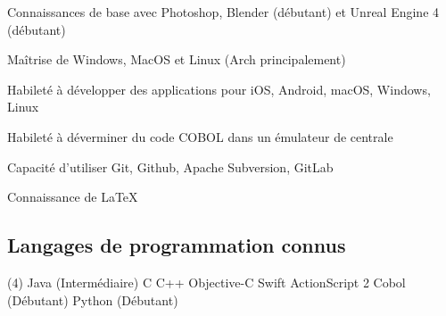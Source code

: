 \begin{cvitems}
\item{Connaissances de base avec Photoshop, Blender (débutant) et Unreal Engine 4 (débutant)}
\item{Maîtrise de Windows, MacOS et Linux (Arch principalement)}
\item{Habileté à développer des applications pour iOS, Android, macOS, Windows, Linux}
\item{Habileté à déverminer du code COBOL dans un émulateur de centrale}
\item{Capacité d'utiliser Git, Github, Apache Subversion, GitLab}
\item{Connaissance de LaTeX}
\end{cvitems}
\subsection*{Langages de programmation connus}
\begin{tasks}(4)
    \task[•] Java (Intermédiaire) \task[•] C
    \task[•] C++ \task[•] Objective-C
    \task[•] Swift \task[•] ActionScript 2
    \task[•] Cobol (Débutant) \task[•] Python (Débutant)
\end{tasks}
